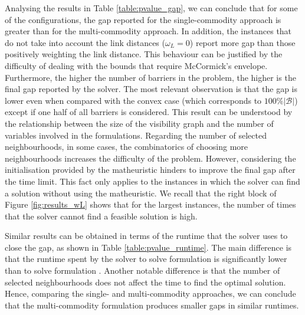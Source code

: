 \documentclass[a4paper,  review, authoryear, 1p.]{elsarticle}
\newcommand{\KMPHN}{{\sf{H-KMPHN}}}
\newcommand{\KMPN}{{\sf{H-KMPN}\xspace }}
\begin{document}
{%
		
		Analysing the results in Table \ref{table:pvalue_gap}, we can conclude that for some of the configurations, the gap reported for the single-commodity approach is greater than for the multi-commodity approach. In addition, the instances that do not take into account the link distances ($\omega_L=0$) report more gap than those positively weighting the link distance. This behaviour can be justified by the difficulty of dealing with the bounds that require McCormick's envelope. Furthermore, the higher the number of barriers in the problem, the higher is the final gap reported by the solver. The most relevant observation is that the gap is lower even when compared with the convex case (which corresponds to $100\% |\mathcal{B}|$) except if one half of all barriers is considered. This result can be understood by the relationship between the size of the visibility graph and the number of variables involved in the formulations. Regarding the number of selected neighbourhoods, in some cases, the combinatorics of choosing more neighbourhoods increases the difficulty of the problem. However, considering the initialisation provided by the matheuristic hinders to improve the final gap after the time limit. This fact only applies to the instances in which the solver can find a solution without using the matheuristic. We recall that the right block of Figure \ref{fig:results_wL} shows that for the largest instances, the number of times that the solver cannot find a feasible solution is high.
		
		Similar results can be obtained in terms of the runtime that the solver uses to close the gap, as shown in Table \ref{table:pvalue_runtime}. The main difference is that the runtime spent by the solver to solve formulation \KMPN \xspace is significantly lower than to solve formulation \KMPHN. Another notable difference is that the number of selected neighbourhoods does not affect the time to find the optimal solution. Hence, comparing the single- and multi-commodity approaches, we can conclude that the multi-commodity formulation produces smaller gaps in similar runtimes. }
		
\end{document}
